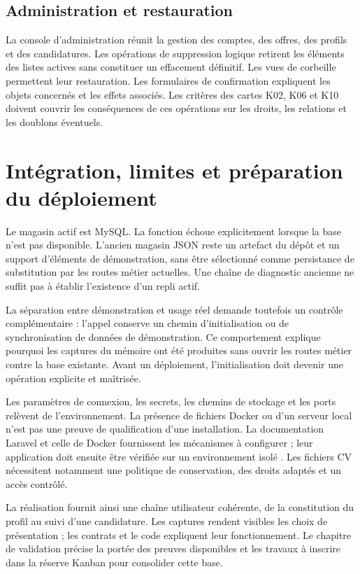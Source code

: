 \subsection{Administration et restauration}
La console d'administration réunit la gestion des comptes, des offres, des profils et des candidatures. Les opérations de suppression logique retirent les éléments des listes actives sans constituer un effacement définitif. Les vues de corbeille permettent leur restauration. Les formulaires de confirmation expliquent les objets concernés et les effets associés. Les critères des cartes K02, K06 et K10 doivent couvrir les conséquences de ces opérations sur les droits, les relations et les doublons éventuels.



\section{Intégration, limites et préparation du déploiement}
Le magasin actif est MySQL. La fonction  échoue explicitement lorsque la base n'est pas disponible. L'ancien magasin JSON reste un artefact du dépôt et un support d'éléments de démonstration, sans être sélectionné comme persistance de substitution par les routes métier actuelles. Une chaîne de diagnostic ancienne ne suffit pas à établir l'existence d'un repli actif.

La séparation entre démonstration et usage réel demande toutefois un contrôle complémentaire : l'appel  conserve un chemin d'initialisation ou de synchronisation de données de démonstration. Ce comportement explique pourquoi les captures du mémoire ont été produites sans ouvrir les routes métier contre la base existante. Avant un déploiement, l'initialisation doit devenir une opération explicite et maîtrisée.

Les paramètres de connexion, les secrets, les chemins de stockage et les ports relèvent de l'environnement. La présence de fichiers Docker ou d'un serveur local n'est pas une preuve de qualification d'une installation. La documentation Laravel et celle de Docker fournissent les mécanismes à configurer ; leur application doit ensuite être vérifiée sur un environnement isolé \cite{laravel-deployment,docker-compose}. Les fichiers CV nécessitent notamment une politique de conservation, des droits adaptés et un accès contrôlé.

La réalisation fournit ainsi une chaîne utilisateur cohérente, de la constitution du profil au suivi d'une candidature. Les captures rendent visibles les choix de présentation ; les contrats et le code expliquent leur fonctionnement. Le chapitre de validation précise la portée des preuves disponibles et les travaux à inscrire dans la réserve Kanban pour consolider cette base.
